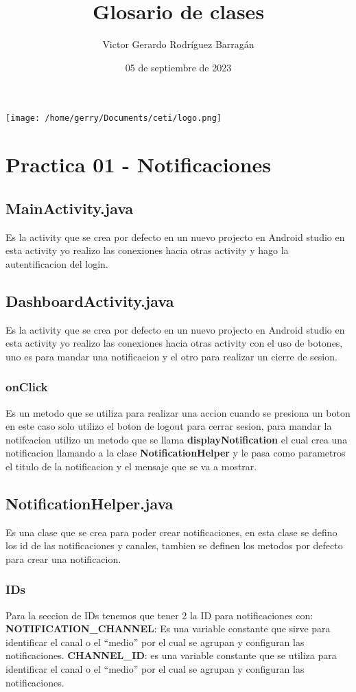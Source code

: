 \documentclass{article}
\title{Glosario de clases}
\author{Victor Gerardo Rodríguez Barragán}
\date{05 de septiembre de 2023}
\begin{document}
\maketitle
\begin{center}
    \texttt{[image: /home/gerry/Documents/ceti/logo.png]}
\end{center}
\justify
\newpage
\tableofcontents
\newpage

\section{Practica 01 - Notificaciones}
\subsection{MainActivity.java}
Es la activity que se crea por defecto en un nuevo projecto en Android studio
en esta activity yo realizo las conexiones hacia otras activity y hago la autentificacion
del login.

\subsection{DashboardActivity.java}
Es la activity que se crea por defecto en un nuevo projecto en Android studio
en esta activity yo realizo las conexiones hacia otras activity con el uso
de botones, uno es para mandar una notificacion y el otro para realizar un
cierre de sesion.

\subsubsection{onClick}
Es un metodo que se utiliza para realizar una accion cuando se presiona un boton
en este caso solo utilizo el boton de logout para cerrar sesion, para mandar la
notifcacion utilizo un metodo que se llama \textbf{displayNotification} el cual
crea una notificacion llamando a la clase \textbf{NotificationHelper} y le pasa
como parametros el titulo de la notificacion y el mensaje que se va a mostrar.

\subsection{NotificationHelper.java}
Es una clase que se crea para poder crear notificaciones, en esta clase se
defino los id de las notificaciones y canales, tambien se definen los metodos
por defecto para crear una notificacion.

\subsubsection{IDs}
Para la seccion de IDs tenemos que tener 2 la ID para notificaciones con:
\textbf{NOTIFICATION\_CHANNEL}: Es una variable constante que sirve para identificar el canal o el ``medio'' por el cual se agrupan y configuran las notificaciones.
\textbf{CHANNEL\_ID}: es una variable constante que se utiliza para identificar
el canal o el ``medio'' por el cual se agrupan y configuran las notificaciones.
\end{document}
